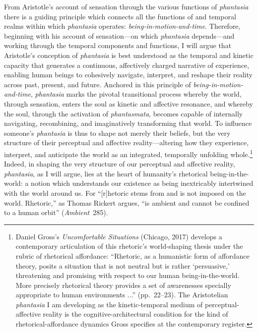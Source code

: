 \documentclass{article}
\begin{document}
From Aristotle's account of sensation through the various functions of \textit{phantasia} there is a guiding principle which connects all the functions of and temporal realms within which \textit{phantasia} operates: \textit{being-in-motion-and-time}. Therefore, beginning with his account of sensation---on which \textit{phantasia} depends---and working through the temporal components and functions, I will argue that Aristotle's conception of \textit{phantasia} is best understood as the temporal and kinetic capacity that generates a continuous, affectively charged narrative of experience, enabling human beings to cohesively navigate, interpret, and reshape their reality across past, present, and future. Anchored in this principle of \textit{being-in-motion-and-time}, \textit{phantasia} marks the pivotal transitional process whereby the world, through sensation, enters the soul as kinetic and affective resonance, and whereby the soul, through the activation of \textit{phantasmata}, becomes capable of internally navigating, recombining, and imaginatively transforming that world. To influence someone's \textit{phantasia} is thus to shape not merely their beliefs, but the very structure of their perceptual and affective reality---altering how they experience, interpret, and anticipate the world as an integrated, temporally unfolding whole.\footnote{Daniel Gross's \textit{Uncomfortable Situations} (Chicago, 2017) develops a contemporary articulation of this rhetoric's world-shaping thesis under the rubric of rhetorical affordance: ``Rhetoric, as a humanistic form of affordance theory, posits a situation that is not neutral but is rather `persuasive,' threatening and promising with respect to our human being-in-the-world. More precisely rhetorical theory provides a set of awarenesses specially appropriate to human environments ...'' (pp.~22--23). The Aristotelian \textit{phantasia} I am developing as the kinetic-temporal medium of perceptual-affective reality is the cognitive-architectural condition for the kind of rhetorical-affordance dynamics Gross specifies at the contemporary register.} Indeed, in shaping the very structure of our perceptual and affective reality, \textit{phantasia}, as I will argue, lies at the heart of humanity's rhetorical being-in-the-world: a notion which understands our existence as being inextricably intertwined with the world around us. For ``[r]hetoric stems from and is not imposed on the world. Rhetoric,'' as Thomas Rickert argues, ``is ambient and cannot be confined to a human orbit'' (\textit{Ambient}~285).
\end{document}
